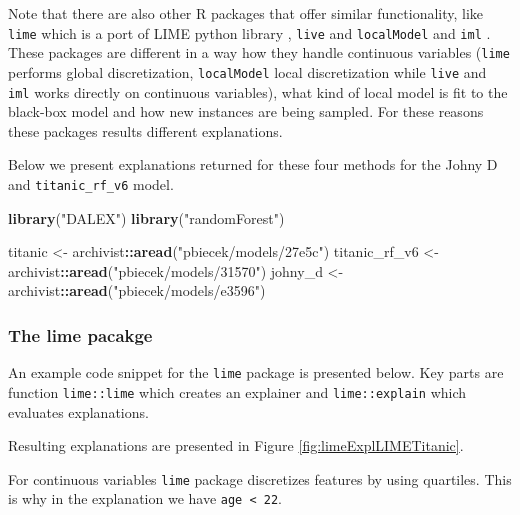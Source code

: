\documentclass[12pt,]{krantz}
\newenvironment{Shaded}{\begin{snugshade}}{\end{snugshade}}
\newcommand{\KeywordTok}[1]{\textcolor[rgb]{0.13,0.29,0.53}{\textbf{#1}}}
\newcommand{\NormalTok}[1]{#1}
\newcommand{\OperatorTok}[1]{\textcolor[rgb]{0.81,0.36,0.00}{\textbf{#1}}}
\newcommand{\StringTok}[1]{\textcolor[rgb]{0.31,0.60,0.02}{#1}}
\theoremstyle{definition}
\theoremstyle{definition}
\theoremstyle{definition}
\theoremstyle{remark}
\begin{document}
Note that there are also other R packages that offer similar
functionality, like \texttt{lime} \citep{R-lime} which is a port of LIME
python library \citep{shapPackage}, \texttt{live} \citep{R-live} and
\texttt{localModel} \citep{localModelPackage} and \texttt{iml}
\citep{imlRPackage}. These packages are different in a way how they
handle continuous variables (\texttt{lime} performs global
discretization, \texttt{localModel} local discretization while
\texttt{live} and \texttt{iml} works directly on continuous variables),
what kind of local model is fit to the black-box model and how new
instances are being sampled. For these reasons these packages results
different explanations.

Below we present explanations returned for these four methods for the
Johny D and \texttt{titanic\_rf\_v6} model.

\begin{Shaded}
\begin{Highlighting}[]
\KeywordTok{library}\NormalTok{(}\StringTok{"DALEX"}\NormalTok{)}
\KeywordTok{library}\NormalTok{(}\StringTok{"randomForest"}\NormalTok{)}

\NormalTok{titanic <-}\StringTok{ }\NormalTok{archivist}\OperatorTok{::}\KeywordTok{aread}\NormalTok{(}\StringTok{"pbiecek/models/27e5c"}\NormalTok{)}
\NormalTok{titanic_rf_v6 <-}\StringTok{ }\NormalTok{archivist}\OperatorTok{::}\KeywordTok{aread}\NormalTok{(}\StringTok{"pbiecek/models/31570"}\NormalTok{)}
\NormalTok{johny_d <-}\StringTok{ }\NormalTok{archivist}\OperatorTok{::}\KeywordTok{aread}\NormalTok{(}\StringTok{"pbiecek/models/e3596"}\NormalTok{)}
\end{Highlighting}
\end{Shaded}

\hypertarget{the-lime-pacakge}{%
\subsubsection{\texorpdfstring{\textbf{The lime
pacakge}}{The lime pacakge}}\label{the-lime-pacakge}}

An example code snippet for the \texttt{lime} package is presented
below. Key parts are function \texttt{lime::lime} which creates an
explainer and \texttt{lime::explain} which evaluates explanations.

Resulting explanations are presented in Figure
\ref{fig:limeExplLIMETitanic}.

For continuous variables \texttt{lime} package discretizes features by
using quartiles. This is why in the explanation we have
\texttt{age\ \textless{}\ 22}.
\end{document}
